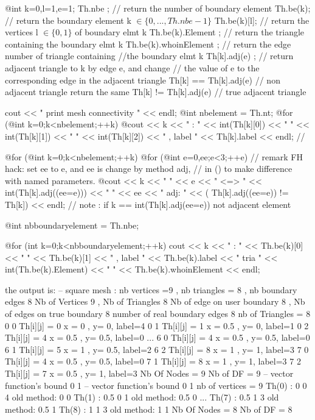 \documentclass[a4paper,twoside,12pt]{book}
\begin{document}
{ @int k=0,l=1,e=1;
  Th.nbe ; // return the number of boundary element  \hfilll
  Th.be(k);   // return the boundary element k $\in \{0,...,Th.nbe-1\}$   \hfilll
  Th.be(k)[l];   // return the vertices l $\in \{0,1\}$ of  boundary elmt k \hfilll
  Th.be(k).Element ;   // return the triangle containing the  boundary elmt k \hfilll
  Th.be(k).whoinElement ;   // return the edge number of triangle containing \hfilll
  //the  boundary elmt k
  Th[k].adj(e) ; // return adjacent triangle to k by edge e, and change \hfill
  // the value of e to the corresponding edge in the adjacent triangle
  Th[k] == Th[k].adj(e) // non adjacent triangle return the same
  Th[k] != Th[k].adj(e) // true adjacent triangle

  cout << " print mesh connectivity " << endl;
  @int nbelement = Th.nt;
  @for (@int k=0;k<nbelement;++k)
    @cout << k << " :  " << int(Th[k][0]) << " " << int(Th[k][1])
         << " " <<  int(Th[k][2])
         << " , label  " << Th[k].label << endl;
  //

  @for (@int k=0;k<nbelement;++k)
    @for (@int e=0,ee;e<3;++e)
      //  remark FH hack:  set ee to e, and ee is change by method adj,
      //  in () to make difference with  named parameters.
	    @cout << k <<  " " << e << " <=>  " << int(Th[k].adj((ee=e))) << " " << ee
	     << "  adj: " << ( Th[k].adj((ee=e)) != Th[k]) << endl;
      // note :     if k == int(Th[k].adj(ee=e)) not adjacent element


  @int nbboundaryelement = Th.nbe;

  @for (int k=0;k<nbboundaryelement;++k)
      cout << k << " : " <<  Th.be(k)[0] << " " << Th.be(k)[1] << " , label "
           << Th.be(k).label <<  " tria  " << int(Th.be(k).Element)
           << " " << Th.be(k).whoinElement <<  endl;

}
\eFF
the output is:
\bFF
 -- square mesh : nb vertices  =9 ,  nb triangles = 8 ,  nb boundary edges 8
    Nb of Vertices 9 ,  Nb of Triangles 8
    Nb of edge on user boundary  8 ,  Nb of edges on true boundary  8
 number of real boundary edges 8
 nb of Triangles = 8
0 0 Th[i][j] = 0  x = 0 , y= 0,  label=4
0 1 Th[i][j] = 1  x = 0.5 , y= 0,  label=1
0 2 Th[i][j] = 4  x = 0.5 , y= 0.5,  label=0
...
6 0 Th[i][j] = 4  x = 0.5 , y= 0.5,  label=0
6 1 Th[i][j] = 5  x = 1 , y= 0.5,  label=2
6 2 Th[i][j] = 8  x = 1 , y= 1,  label=3
7 0 Th[i][j] = 4  x = 0.5 , y= 0.5,  label=0
7 1 Th[i][j] = 8  x = 1 , y= 1,  label=3
7 2 Th[i][j] = 7  x = 0.5 , y= 1,  label=3
 Nb Of Nodes = 9
 Nb of DF = 9
 -- vector function's bound  0 1
 -- vector function's bound  0 1
 nb of vertices = 9
Th(0) : 0 0 4       old method: 0 0
Th(1) : 0.5 0 1       old method: 0.5 0
...
Th(7) : 0.5 1 3       old method: 0.5 1
Th(8) : 1 1 3       old method: 1 1
 Nb Of Nodes = 8
 Nb of DF = 8
\end{document}
